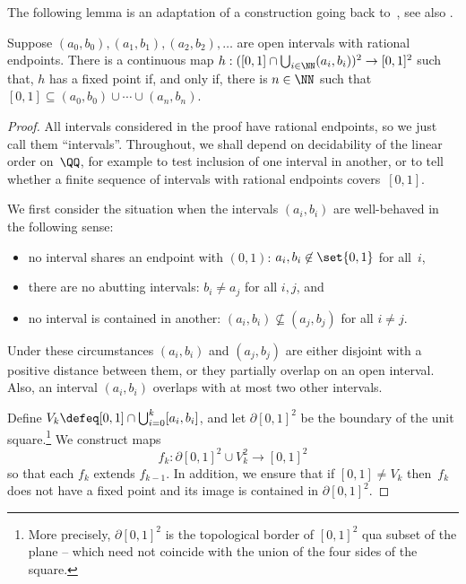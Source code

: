 The following lemma is an adaptation of a construction going back to~\cite{orevkov63}, see also \cite[Thm.~IV.10.1]{beeson85:_found_const_mathem}.

\begin{lemmaC}
  \label{lem:fix-point-free-map}%
  Suppose $(a_0, b_0), (a_1, b_1), (a_2, b_2), \ldots$ are open intervals with rational endpoints.
  There is a continuous map $h : ([0,1] \cap \bigcup_{i \in \NN} (a_i, b_i))^2 \to [0,1]^2$ such that, $h$ has a fixed point if, and only if, there is $n \in \NN$ such that  $[0,1] \subseteq (a_0, b_0) \cup \cdots \cup (a_n, b_n)$.
\end{lemmaC}

\begin{proof}
  All intervals considered in the proof have rational endpoints, so we just call them ``intervals''.
  Throughout, we shall depend on decidability of the linear order on~$\QQ$, for example to test inclusion of one interval in another, or to tell whether a finite sequence of intervals with rational endpoints covers~$[0,1]$.

  We first consider the situation when the intervals $(a_i, b_i)$ are well-behaved in the following sense:
  \begin{itemize}
  \item no interval shares an endpoint with $(0,1)$: $a_i, b_i \not\in \set{0,1}$ for all~$i$,
  \item there are no abutting intervals: $b_i \neq a_j$ for all $i, j$, and
  \item no interval is contained in another: $(a_i, b_i) \not\subseteq (a_j, b_j)$ for all $i \neq j$.
  \end{itemize}
  Under these circumstances $(a_i, b_i)$ and $(a_j, b_j)$ are either disjoint with a positive distance between them, or they partially overlap on an open interval. Also, an interval $(a_i, b_i)$ overlaps with at most two other intervals.

  Define $V_k \defeq [0,1] \cap \bigcup_{i = 0}^k [a_i, b_i]$, and let $\partial[0,1]^2$ be the boundary of the unit square.\footnote{More precisely, $\partial[0,1]^2$ is the topological border of $[0,1]^2$ qua subset of the plane -- which need not coincide with the union of the four sides of the square.}
  We construct maps
  \begin{equation*}
    f_k : \partial[0,1]^2 \cup V_k^2 \to [0,1]^2
  \end{equation*}
  so that each $f_k$ extends $f_{k-1}$. In addition, we ensure that if $[0,1] \neq V_k$ then~$f_k$ does not have a fixed point and its image is contained in $\partial[0,1]^2$.


\end{proof}
